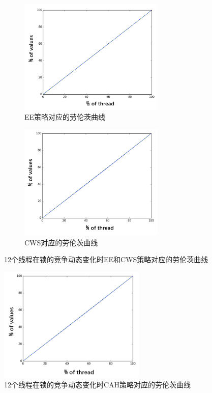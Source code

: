 \begin{figure}[!htp]
  \centering
  \begin{subfigure}{8.0cm}
    \centering
    \includegraphics[height=5.5cm]{figure/EE-varying.png}
    \caption{EE策略对应的劳伦茨曲线}
  \end{subfigure}
  \hspace{1em}
  \begin{subfigure}{6.0cm}
    \centering
    \includegraphics[height=5.5cm]{figure/CWS-varing.png}
    \caption{CWS对应的劳伦茨曲线}
  \end{subfigure}
  \caption{12个线程在锁的竞争动态变化时EE和CWS策略对应的劳伦茨曲线}
  \label{fig:EE-CWS-varying}
\end{figure}

\begin{figure}[t]
	\centering
	\includegraphics[height=5.5cm]{figure/CAH-varying.png}
	\caption{12个线程在锁的竞争动态变化时CAH策略对应的劳伦茨曲线}
	\label{Fig:CAH-varying}
\end{figure}

